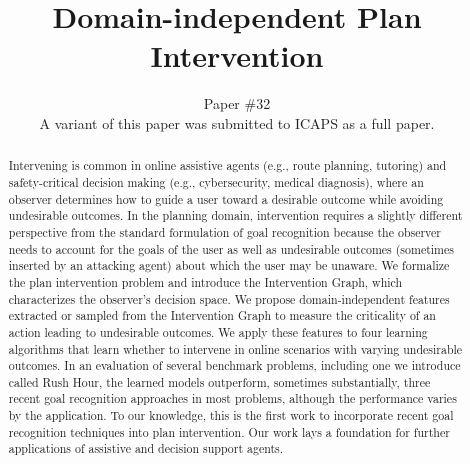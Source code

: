 \documentclass[letterpaper]{article}
\theoremstyle{plain}
\begin{document}
\title{Domain-independent Plan Intervention}
\author{ Paper \#32\\
\small{A variant of this paper was submitted to ICAPS as a full paper.}}
\newcommand{\debug}[2]{[\textbf{DEBUG #1}: \textcolor{WildStrawberry}{\textit{#2}}]}
\nocopyright
\maketitle
\begin{abstract}
Intervening is common in online assistive agents (e.g., route planning, tutoring) and safety-critical decision making (e.g., cybersecurity, medical diagnosis), where an observer determines how to guide a user toward a desirable outcome while avoiding undesirable outcomes.
In the planning domain, intervention requires a slightly different perspective from the standard formulation of goal recognition because the observer needs to account for the goals of the user as well as undesirable outcomes (sometimes inserted by an attacking agent) about which the user may be unaware.
We formalize the plan intervention problem and introduce the Intervention Graph, which characterizes the observer's decision space.
We propose domain-independent features extracted or sampled from the Intervention Graph to measure the criticality of an action leading to undesirable outcomes.
We apply these features to four learning algorithms that learn whether to intervene in online scenarios with varying undesirable outcomes.
In an evaluation of several benchmark problems, including one we introduce called Rush Hour,
the learned models outperform, sometimes substantially, three recent goal recognition approaches in most problems, although the performance varies by the application.
To our knowledge, this is the first work to incorporate recent goal recognition techniques into plan intervention.
Our work lays a foundation for further applications of assistive and decision support agents.
\end{abstract}
\end{document}
